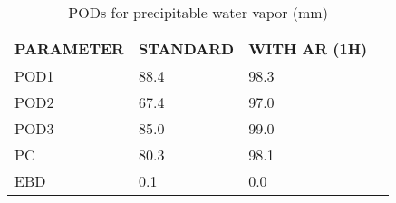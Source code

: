 \begin{table}[]
\begin{center}
\begin{tabular}{|l|l|l|l|}
\hline
\multicolumn{1}{|c|}{\cellcolor[HTML]{C0C0C0}\textbf{PARAMETER}} & \multicolumn{1}{c|}{\cellcolor[HTML]{C0C0C0}\textbf{STANDARD}} & \multicolumn{1}{c|}{\cellcolor[HTML]{C0C0C0}\textbf{WITH AR (1H)}} \\
\hline
\cellcolor[HTML]{C0C0C0}POD1  & 88.4                                & 98.3         \\
\cellcolor[HTML]{C0C0C0}POD2  & 67.4                                & 97.0         \\
\cellcolor[HTML]{C0C0C0}POD3  & 85.0                                & 99.0         \\
\cellcolor[HTML]{C0C0C0}PC    & 80.3                                  & 98.1           \\
\cellcolor[HTML]{C0C0C0}EBD   & 0.1                                 & 0.0          \\
\hline
\end{tabular}
\caption{PODs for precipitable water vapor (mm)}
\end{center}
\end{table}
